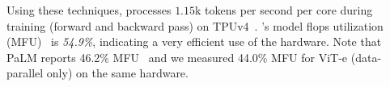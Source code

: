 Using these techniques, \chonk processes $1.15$k tokens per second per core during training (forward and backward pass) on TPUv4~\citep{jouppi2020domain}. 
\chonk's model flops utilization (MFU)~\citep{chowdhery2022palm,dehghani2021efficiency} is \emph{54.9\%}, indicating a very efficient use of the hardware. Note that PaLM reports 46.2\% MFU~\citep{chowdhery2022palm, pope2022efficiently} and we measured 44.0\% MFU for ViT-e (data-parallel only) on the same hardware.

